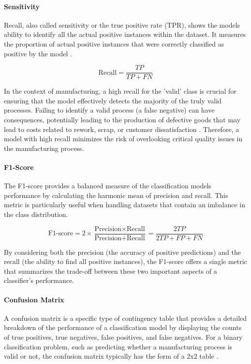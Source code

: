 \paragraph{\textbf{Sensitivity}}
Recall, also called sensitivity or the true positive rate (TPR), shows the models ability to identify all the actual positive instances within the dataset. It measures the proportion of actual positive instances that were correctly classified as positive by the model \autocite{fahrmeir2016statistik}.

\begin{equation}
    \label{eq:recall}
    \text{Recall} = \frac{TP}{TP + FN}
\end{equation}

In the context of manufacturing, a high recall for the 'valid' class is crucial for ensuring that the model effectively detects the majority of the truly valid processes. Failing to identify a valid process (a false negative) can have consequences, potentially leading to the production of defective goods that may lead to costs related to rework, scrap, or customer dissatisfaction \autocite{kharitonov2022comparative}. Therefore, a model with high recall minimizes the risk of overlooking critical quality issues in the manufacturing process.

\paragraph{\textbf{F1-Score}}
The F1-score provides a balanced measure of the classification models performance by calculating the harmonic mean of precision and recall. This metric is particularly useful when handling datasets that contain an imbalance in the class distribution.

\begin{equation}
    \label{eq:F1-score}
    \text{F1-score} = 2 \times \frac{\text{Precision} \times \text{Recall}}{\text{Precision} + \text{Recall}} = \frac{2TP}{2TP + FP + FN}
\end{equation}

By considering both the precision (the accuracy of positive predictions) and the recall (the ability to find all positive instances), the F1-score offers a single metric that summarizes the trade-off between these two important aspects of a classifier's performance.

\paragraph{\textbf{Confusion Matrix}}
A confusion matrix is a specific type of contingency table that provides a detailed breakdown of the performance of a classification model by displaying the counts of true positives, true negatives, false positives, and false negatives. For a binary classification problem, such as predicting whether a manufacturing process is valid or not, the confusion matrix typically has the form of a 2x2 table \autocite{fahrmeir2016statistik}.

